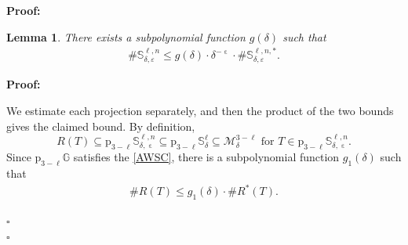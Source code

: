 \documentclass[a4paper, 11pt]{article}
\newenvironment{Proof}{\noindent \textbf{Proof:}}{\hfill$\square$\\}
\DeclareMathOperator{\eps}{\varepsilon}
\numberwithin{equation}{section}
\theoremstyle{plain}
\newtheorem{lemma}[theorem]{Lemma}
\theoremstyle{remark}
\theoremstyle{definition}
\begin{document}
\begin{Proof}
\begin{lemma} \label{futol1} There exists a subpolynomial function $g(\delta)$ such that 
	\begin{align*}
		\# \mathbb{S}_{\delta, \varepsilon}^{\ell, n} \leq g(\delta) \cdot \delta^{-\eps} \cdot \# \mathbb{S}_{\delta, \varepsilon}^{\ell, n, *}.
	\end{align*}
\end{lemma}

\begin{Proof}

We estimate each projection separately, and then the product of the two bounds gives the claimed bound.
By definition, 
\[
R(T) \subseteq \mathrm{p}_{3-\ell}\mathbb{S}_{\delta, \eps}^{\ell, n} \subseteq \mathrm{p}_{3-\ell}\mathbb{S}_{\delta}^{\ell} \subseteq \mathcal{M}_\delta^{3-\ell}\text{ for $T \in \mathrm{p}_{3-\ell}\mathbb{S}_{\delta, \eps}^{\ell, n}$}.
\]
Since $\mathrm{p}_{3-\ell}\mathbb{G}$ satisfies the \ref{AWSC}, there is a subpolynomial function $g_1(\delta)$ such that 
\begin{align*}
\#R(T) \leq g_1(\delta) \cdot \#R^*(T).
\end{align*}


\end{Proof}
\end{Proof}
\end{document}
